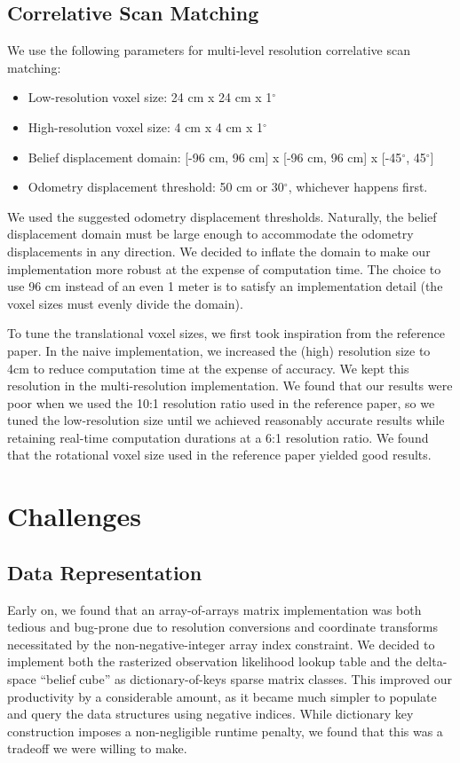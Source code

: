 \documentclass[11pt]{article}
\begin{document}
\subsection{Correlative Scan Matching}

We use the following parameters for multi-level resolution correlative scan
matching:

\begin{itemize}
    \item Low-resolution voxel size: 24 cm x 24 cm x 1$^\circ$
    \item High-resolution voxel size: 4 cm x 4 cm x 1$^\circ$
    \item Belief displacement domain: [-96 cm, 96 cm] x [-96 cm, 96 cm] x [-45$^\circ$, 45$^\circ$]
    \item Odometry displacement threshold: 50 cm or 30$^\circ$, whichever happens first.
\end{itemize}

\noindent
We used the suggested odometry displacement thresholds. Naturally, the belief
displacement domain must be large enough to accommodate the odometry
displacements in any direction. We decided to inflate the domain to make our
implementation more robust at the expense of computation time. The choice to use
96 cm instead of an even 1 meter is to satisfy an implementation detail
(the voxel sizes must evenly divide the domain).

\bigskip
\noindent
To tune the translational voxel sizes, we first took inspiration from the
reference paper. In the naive implementation, we increased the (high) resolution
size to 4cm to reduce computation time at the expense of accuracy. We kept this
resolution in the multi-resolution implementation. We found that our results
were poor when we used the 10:1 resolution ratio used in the reference paper, so
we tuned the low-resolution size until we achieved reasonably accurate results
while retaining real-time computation durations at a 6:1 resolution ratio. We
found that the rotational voxel size used in the reference paper yielded good
results.

\section{Challenges}

\subsection{Data Representation}
Early on, we found that an array-of-arrays matrix implementation was both
tedious and bug-prone due to resolution conversions and coordinate transforms
necessitated by the non-negative-integer array index constraint. We decided to
implement both the rasterized observation likelihood lookup table and the
delta-space ``belief cube'' as dictionary-of-keys sparse matrix classes. This
improved our productivity by a considerable amount, as it became much simpler to
populate and query the data structures using negative indices. While dictionary
key construction imposes a non-negligible runtime penalty, we found that this
was a tradeoff we were willing to make.
\end{document}

